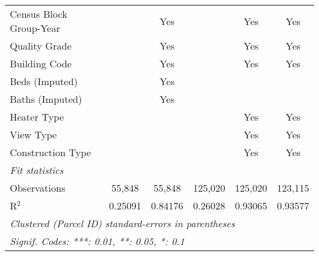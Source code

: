 \begin{table}[htbp]
\begin{tabular}{lccccc}
      Census Block Group-Year               &                 & Yes           &                 & Yes             & Yes\\  
      Quality Grade                         &                 & Yes           &                 & Yes             & Yes\\  
      Building Code                         &                 & Yes           &                 & Yes             & Yes\\  
      Beds (Imputed)                        &                 & Yes           &                 &                 & \\  
      Baths (Imputed)                       &                 & Yes           &                 &                 & \\  
      Heater Type                           &                 &               &                 & Yes             & Yes\\  
      View Type                             &                 &               &                 & Yes             & Yes\\  
      Construction Type                     &                 &               &                 & Yes             & Yes\\  
      \midrule
      \emph{Fit statistics}\\
      Observations                          & 55,848          & 55,848        & 125,020         & 125,020         & 123,115\\  
      R$^2$                                 & 0.25091         & 0.84176       & 0.26028         & 0.93065         & 0.93577\\  
      \midrule \midrule
      \multicolumn{6}{l}{\emph{Clustered (Parcel ID) standard-errors in parentheses}}\\
      \multicolumn{6}{l}{\emph{Signif. Codes: ***: 0.01, **: 0.05, *: 0.1}}\\
   \end{tabular}
\end{table}

